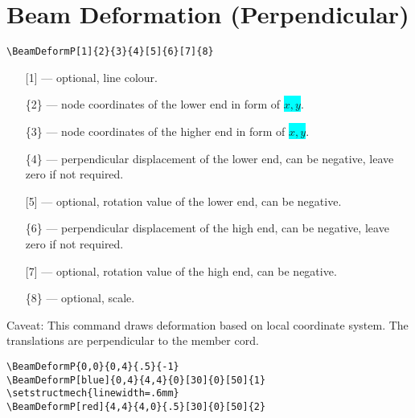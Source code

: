 \documentclass[10pt,a4paper]{article}
\newcommand*{\Highlight}[1]{\colorbox{cyan}{\color{red}\texttt{#1}}}
\begin{document}
\section{Beam Deformation (Perpendicular)}
\begin{Verbatim}[frame=single,label=Syntax]
\BeamDeformP[1]{2}{3}{4}[5]{6}[7]{8}
\end{Verbatim}
\begin{enumerate}
\item[][1] --- optional, line colour.
\item[]\{2\} --- node coordinates of the lower end in form of \Highlight{$x,y$}.
\item[]\{3\} --- node coordinates of the higher end in form of \Highlight{$x,y$}.
\item[]\{4\} --- perpendicular displacement of the lower end, can be negative, leave zero if not required.
\item[][5] --- optional, rotation value of the lower end, can be negative.
\item[]\{6\} --- perpendicular displacement of the high end, can be negative, leave zero if not required.
\item[][7] --- optional, rotation value of the high end, can be negative.
\item[]\{8\} --- optional, scale.
\end{enumerate}
Caveat: This command draws deformation based on local coordinate system. The translations are perpendicular to the member cord.
\begin{Verbatim}[frame=single,label=Example]
\BeamDeformP{0,0}{0,4}{.5}{-1}
\BeamDeformP[blue]{0,4}{4,4}{0}[30]{0}[50]{1}
\setstructmech{linewidth=.6mm}
\BeamDeformP[red]{4,4}{4,0}{.5}[30]{0}[50]{2}
\end{Verbatim}
\begin{figure}[H]
\centering
{}
\end{figure}
\end{document}
